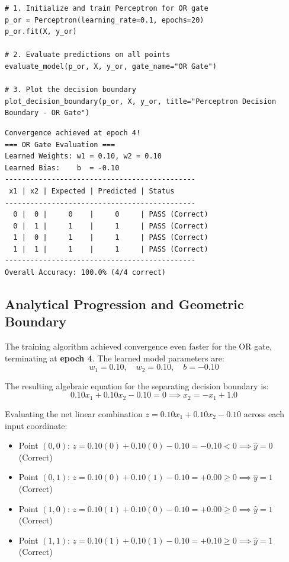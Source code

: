 \documentclass[12pt]{article}
\begin{document}
\begin{lstlisting}[style=code]
# 1. Initialize and train Perceptron for OR gate
p_or = Perceptron(learning_rate=0.1, epochs=20)
p_or.fit(X, y_or)

# 2. Evaluate predictions on all points
evaluate_model(p_or, X, y_or, gate_name="OR Gate")

# 3. Plot the decision boundary
plot_decision_boundary(p_or, X, y_or, title="Perceptron Decision Boundary - OR Gate")
\end{lstlisting}

\begin{lstlisting}[style=output]
Convergence achieved at epoch 4!
=== OR Gate Evaluation ===
Learned Weights: w1 = 0.10, w2 = 0.10
Learned Bias:    b  = -0.10
---------------------------------------------
 x1 | x2 | Expected | Predicted | Status 
---------------------------------------------
  0 |  0 |     0    |     0     | PASS (Correct)
  0 |  1 |     1    |     1     | PASS (Correct)
  1 |  0 |     1    |     1     | PASS (Correct)
  1 |  1 |     1    |     1     | PASS (Correct)
---------------------------------------------
Overall Accuracy: 100.0% (4/4 correct)
\end{lstlisting}

\subsection{Analytical Progression and Geometric Boundary}
The training algorithm achieved convergence even faster for the OR gate, terminating at \textbf{epoch 4}. The learned model parameters are:
\begin{equation}
    w_1 = 0.10, \quad w_2 = 0.10, \quad b = -0.10
\end{equation}

The resulting algebraic equation for the separating decision boundary is:
\begin{equation}
    0.10 x_1 + 0.10 x_2 - 0.10 = 0 \implies x_2 = -x_1 + 1.0
\end{equation}

Evaluating the net linear combination $z = 0.10 x_1 + 0.10 x_2 - 0.10$ across each input coordinate:
\begin{itemize}
    \item Point $(0, 0)$: $z = 0.10(0) + 0.10(0) - 0.10 = -0.10 < 0 \implies \hat{y} = 0$ (Correct)
    \item Point $(0, 1)$: $z = 0.10(0) + 0.10(1) - 0.10 = +0.00 \ge 0 \implies \hat{y} = 1$ (Correct)
    \item Point $(1, 0)$: $z = 0.10(1) + 0.10(0) - 0.10 = +0.00 \ge 0 \implies \hat{y} = 1$ (Correct)
    \item Point $(1, 1)$: $z = 0.10(1) + 0.10(1) - 0.10 = +0.10 \ge 0 \implies \hat{y} = 1$ (Correct)
\end{itemize}
\end{document}
